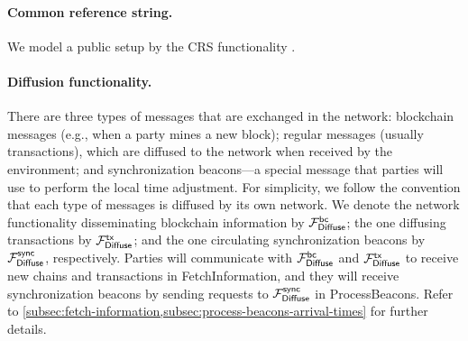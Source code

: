 

\paragraph{Common reference string.}
%
We model a public setup by the CRS functionality \funcCRS.



\paragraph{Diffusion functionality.}
%
There are three types of messages that are exchanged in the network: blockchain messages (e.g., when a party mines a new block); regular messages (usually transactions), which are diffused to the network when received by the environment; and synchronization beacons---a special message that parties will use to perform the local time adjustment.
%
For simplicity, we follow the convention that each type of messages is diffused by its own network.
%
We denote the network functionality disseminating blockchain information by $\mathcal{F}_{\mathsf{Diffuse}}^{\mathsf{bc}}$; the one diffusing transactions by $\mathcal{F}_{\mathsf{Diffuse}}^{\mathsf{tx}}$; and the one circulating synchronization beacons by $\mathcal{F}_{\mathsf{Diffuse}}^{\mathsf{sync}}$, respectively.
%
Parties will communicate with $\mathcal{F}_{\mathsf{Diffuse}}^{\mathsf{bc}}$ and $\mathcal{F}_{\mathsf{Diffuse}}^{\mathsf{tx}}$ to receive new chains and transactions in \textsf{FetchInformation}, and they will receive synchronization beacons by sending requests to $\mathcal{F}_{\mathsf{Diffuse}}^{\mathsf{sync}}$ in \textsf{ProcessBeacons}.
%
Refer to \cref{subsec:fetch-information,subsec:process-beacons-arrival-times} for further details.


